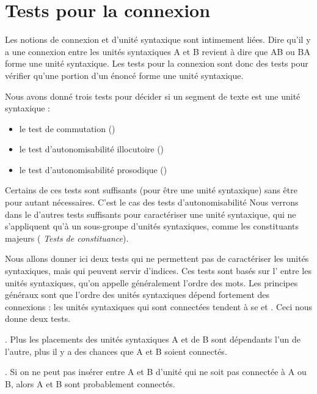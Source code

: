 \section{Tests pour la connexion}\label{sec:3.2.16}

Les notions de connexion et d’unité syntaxique sont intimement liées. Dire qu’il y a une connexion entre les unités syntaxiques A et B revient à dire que AB ou BA forme une unité syntaxique. Les tests pour la connexion sont donc des tests pour vérifier qu’une portion d’un énoncé forme une unité syntaxique.

Nous avons donné trois tests pour décider si un segment de texte est une unité syntaxique :

\begin{itemize}
\item le test de commutation ()
\item le test d’autonomisabilité illocutoire ()
\item le test d’autonomisabilité prosodique ()
\end{itemize}

Certains de ces tests sont suffisants (pour être une unité syntaxique) sans être pour autant nécessaires. C'est le cas des tests d'autonomisabilité
Nous verrons dans le  d'autres tests suffisants pour caractériser une unité syntaxique, qui ne s’appliquent qu’à un sous-groupe d’unités syntaxiques, comme les constituants majeurs ( \textit{Tests de constituance}).

Nous allons donner ici deux tests qui ne permettent pas de caractériser les unités syntaxiques, mais qui peuvent servir d'indices. Ces tests sont basés sur l' entre les unités syntaxiques, qu'on appelle généralement l'ordre des mots. Les principes généraux sont que l’ordre des unités syntaxiques dépend fortement des connexions : les unités syntaxiques qui sont connectées tendent à se   et . Ceci nous donne deux tests.

{. Plus les placements des unités syntaxiques A et de B sont dépendants l’un de l’autre, plus il y a des chances que A et B soient connectés.}

{. Si on ne peut pas insérer entre A et B d’unité qui ne soit pas connectée à A ou B, alors A et B sont probablement connectés.}

